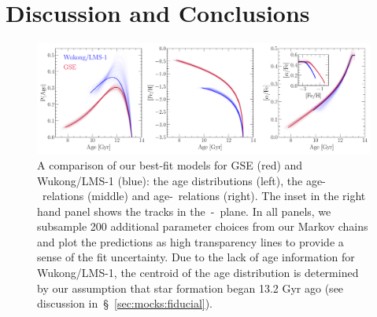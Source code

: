 \documentclass[ms.tex]{subfiles}
\begin{document}
\section{Discussion and Conclusions}
\label{sec:conclusions}

\begin{figure}
\centering
\includegraphics[scale = 0.45]{gse_wukong_comparison.pdf}
\caption{
A comparison of our best-fit models for GSE (red) and Wukong/LMS-1 (blue): the
age distributions (left), the age-\feh~relations (middle) and age-\afe~relations
(right).
The inset in the right hand panel shows the tracks in the~\afe-\feh~plane.
In all panels, we subsample 200 additional parameter choices from our Markov
chains and plot the predictions as high transparency lines to provide a sense
of the fit uncertainty.
Due to the lack of age information for Wukong/LMS-1, the centroid of the age
distribution is determined by our assumption that star formation began 13.2
Gyr ago (see discussion in~\S~\ref{sec:mocks:fiducial}).
}
\label{fig:comparison}
\end{figure}
\end{document}
